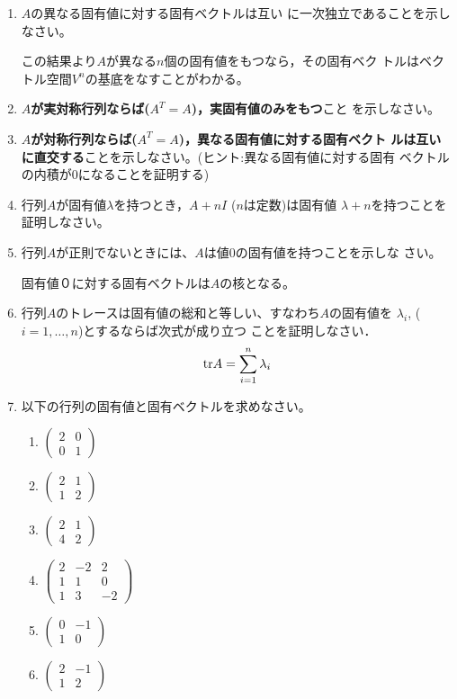 \documentclass[twocolumn,11pt]{jarticle}
\begin{document}
\begin{enumerate}
\item\label{item:depevec} $A$の異なる固有値に対する固有ベクトルは互い
  に一次独立であることを示しなさい。
  
  \comment この結果より$A$が異なる$n$個の固有値をもつなら，その固有ベク
  トルはベクトル空間$V^n$の基底をなすことがわかる。
\item \textbf{$A$が実対称行列ならば($A^T=A$)，実固有値のみをもつ}こと
  を示しなさい。
\item \textbf{$A$が対称行列ならば($A^T=A$)，異なる固有値に対する固有ベクト
  ルは互いに直交する}ことを示しなさい。(ヒント:異なる固有値に対する固有
  ベクトルの内積が0になることを証明する)
\item 行列$A$が固有値$\lambda$を持つとき，$A+nI$ ($n$は定数)は固有値
  $\lambda+n$を持つことを証明しなさい。
\item 行列$A$が正則でないときには、$A$は値0の固有値を持つことを示しな
  さい。

  \comment 固有値０に対する固有ベクトルは$A$の核となる。　
\item 行列$A$のトレースは固有値の総和と等しい、すなわち$A$の固有値を
  $\lambda_i$, ($i=1,\ldots,n$)とするならば次式が成り立つ
  ことを証明しなさい．
  \begin{align}
    \mbox{tr} A=\sum_{i=1}^n{\lambda_i}\notag
  \end{align}
\item\label{item:get-eigen} 
  以下の行列の固有値と固有ベクトルを求めなさい。
  \begin{enumerate}
  \item
    $\begin{pmatrix}
      2 & 0\\
      0 & 1
    \end{pmatrix}$
  \item $\begin{pmatrix}
      2 & 1\\
      1 & 2
    \end{pmatrix}$
  \item $\begin{pmatrix}
      2 & 1 \\
      4 & 2
    \end{pmatrix}$
  \item $\begin{pmatrix}
      2 & -2 & 2\\1 & 1 & 0\\1 & 3 & -2
    \end{pmatrix}$
  \item $\begin{pmatrix}
      0 & -1\\
      1 & 0
    \end{pmatrix}$
  \item $\begin{pmatrix}
      2 & -1\\
      1 & 2
    \end{pmatrix}$
\end{enumerate}



\end{enumerate}
\end{document}
